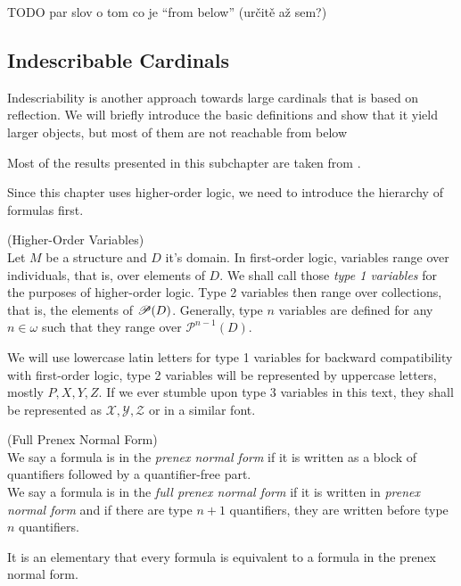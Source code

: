 
TODO par slov o tom co je ``from below'' (určitě až sem?)

\subsection{Indescribable Cardinals}

Indescriability is another approach towards large cardinals that is based on reflection. 
We will briefly introduce the basic definitions and show that it yield larger objects, but most of them are not reachable from below

Most of the results presented in this subchapter are taken from \cite{KanamoriBook}.

Since this chapter uses higher-order logic, we need to introduce the hierarchy of formulas first.

\begin{definition}{(Higher-Order Variables)}\label{def:higher_order_variables}\\
Let $M$ be a structure and $D$ it's domain. In first-order logic, variables range over individuals, that is, over elements of $D$. We shall call those \emph{type 1 variables} for the purposes of higher-order logic. Type 2 variables then range over collections, that is, the elements of $\mathscr{P} (D)$. Generally, type $n$ variables are defined for any $n \in \omega$ such that they range over $\mathscr{P}^{n-1}(D)$.
\end{definition}
We will use lowercase latin letters for type 1 variables for backward compatibility with first-order logic, type 2 variables will be represented by uppercase letters, mostly $P, X, Y, Z$. If we ever stumble upon type 3 variables in this text, they shall be represented as $\mathscr{X}, \mathscr{Y}, \mathscr{Z}$ or in a similar font.

\begin{definition}{(Full Prenex Normal Form)}\label{def:pnf}\\
We say a formula is in the \emph{prenex normal form} if it is written as a block of quantifiers followed by a quantifier-free part.\\
We say a formula is in the \emph{full prenex normal form} if it is written in \emph{prenex normal form} and if there are type $n+1$ quantifiers, they are written before type $n$ quantifiers.
\end{definition}
It is an elementary that every formula is equivalent to a formula in the prenex normal form.


